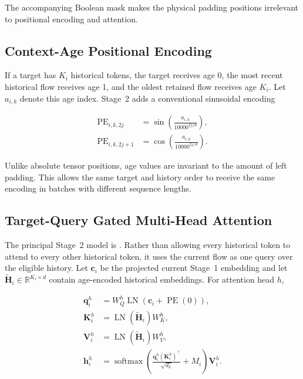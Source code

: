 \documentclass[11pt,fleqn]{report}
\begin{document}
The accompanying Boolean mask makes the physical padding positions irrelevant
to positional encoding and attention.

\subsection{Context-Age Positional Encoding}
\label{subsubsec:context_age_encoding}

If a target has $K_i$ historical tokens, the target receives age 0, the most
recent historical flow receives age 1, and the oldest retained flow receives
age $K_i$. Let $a_{i,k}$ denote this age index. Stage~2 adds a conventional
sinusoidal encoding

\begin{align}
    \operatorname{PE}_{i,k,2j}
    &=\sin\left(
        \frac{a_{i,k}}{10000^{2j/d}}
      \right),\\
    \operatorname{PE}_{i,k,2j+1}
    &=\cos\left(
        \frac{a_{i,k}}{10000^{2j/d}}
      \right).
    \label{eq:stage2_age_encoding}
\end{align}

Unlike absolute tensor positions, age values are invariant to the amount of
left padding. This allows the same target and history order to receive the same
encoding in batches with different sequence lengths.

\subsection{Target-Query Gated Multi-Head Attention}
\label{subsubsec:target_query_attention}

The principal Stage~2 model is
. Rather than allowing every historical token
to attend to every other historical token, it uses the current flow as one
query over the eligible history. Let $\mathbf{c}_i$ be the projected current
Stage~1 embedding and let
$\widetilde{\mathbf{H}}_i\in\mathbb{R}^{K_i\times d}$ contain age-encoded
historical embeddings. For attention head $h$,

\begin{align}
    \mathbf{q}^{h}_i
    &=W_Q^{h}\operatorname{LN}
      \left(\mathbf{c}_i+\operatorname{PE}(0)\right),\\
    \mathbf{K}^{h}_i
    &=\operatorname{LN}(\widetilde{\mathbf{H}}_i)W_K^{h},\\
    \mathbf{V}^{h}_i
    &=\operatorname{LN}(\widetilde{\mathbf{H}}_i)W_V^{h},\\
    \mathbf{h}^{h}_i
    &=\operatorname{softmax}
      \left(
        \frac{\mathbf{q}^{h}_i(\mathbf{K}^{h}_i)^{\top}}
             {\sqrt{d_h}}+M_i
      \right)
      \mathbf{V}^{h}_i.
    \label{eq:target_query_attention}
\end{align}
\end{document}
